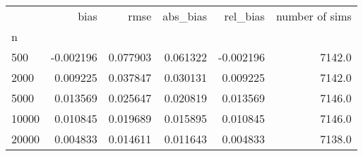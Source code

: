 \begin{tabular}{lrrrrr}
\toprule
{} &      bias &      rmse &  abs_bias &  rel_bias &  number of sims \\
n     &           &           &           &           &                 \\
\midrule
500   & -0.002196 &  0.077903 &  0.061322 & -0.002196 &          7142.0 \\
2000  &  0.009225 &  0.037847 &  0.030131 &  0.009225 &          7142.0 \\
5000  &  0.013569 &  0.025647 &  0.020819 &  0.013569 &          7146.0 \\
10000 &  0.010845 &  0.019689 &  0.015895 &  0.010845 &          7146.0 \\
20000 &  0.004833 &  0.014611 &  0.011643 &  0.004833 &          7138.0 \\
\bottomrule
\end{tabular}
